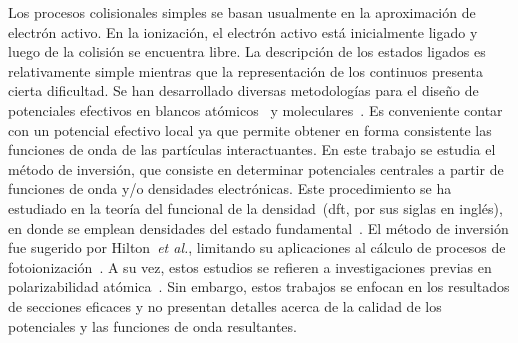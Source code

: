 Los procesos colisionales simples se basan usualmente en la 
aproximación de electrón activo. En la ionización, el electrón activo 
está inicialmente ligado y luego de la colisión se encuentra libre. La 
descripción de los estados ligados es relativamente simple mientras que 
la representación de los continuos presenta cierta dificultad. Se han 
desarrollado diversas metodologías para el diseño de potenciales 
efectivos en blancos atómicos~\cite{Hibbert:82,Gombas:56,Green:69,
Klapisch:71,Phillips:59,Herman:63,Dalgarno:70,Bayliss:77,Cowan:76,
Lee:77} y moleculares~\cite{Menchero:10,Granados:16}. Es conveniente 
contar con un potencial efectivo local ya que permite obtener en forma 
consistente las funciones de onda de las partículas interactuantes. 
En este trabajo se estudia el método de inversión, que consiste en 
determinar potenciales centrales a partir de funciones de onda y/o 
densidades electrónicas. Este procedimiento se ha estudiado en la 
teoría del funcional de la densidad~(\acs{dft}, por sus siglas en 
inglés), en donde se emplean densidades del estado 
fundamental~\cite{Wu:03,Gaiduk:13,Ryabinkin:15,Schipper:97,deSilva:12,
Kananenka:13,Jacob:11}. El método 
de inversión fue sugerido por Hilton~\textit{et al.}, limitando su 
aplicaciones al cálculo de procesos de fotoionización~\cite{Hilton:77,
Suzer:77,Hilton:79,Hilton:80,Crljen:87}. A su vez, estos estudios se 
refieren a investigaciones previas en polarizabilidad 
atómica~\cite{Sternheimer:54,Dalgarno:59}. Sin embargo, estos trabajos 
se enfocan en los resultados de secciones eficaces y no presentan 
detalles acerca de la calidad de los potenciales y las funciones de onda 
resultantes. 

